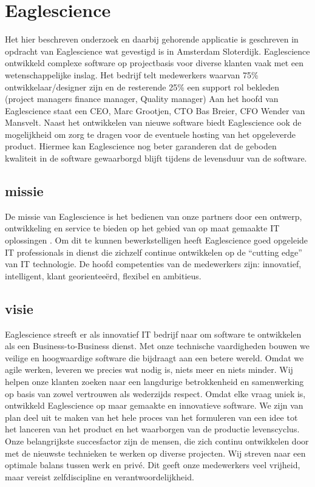 \chapter{Eaglescience} %

\label{ch:Eaglescience} %

Het hier beschreven onderzoek en daarbij gehorende applicatie is geschreven in opdracht van Eaglescience wat gevestigd is in Amsterdam Sloterdijk. Eaglescience ontwikkeld complexe software op projectbasis voor diverse klanten vaak met een wetenschappelijke inslag. Het bedrijf telt  medewerkers waarvan 75\% ontwikkelaar/designer zijn en de resterende 25\% een support rol bekleden (project managers finance manager, Quality manager)  Aan het hoofd van Eaglescience staat een CEO, Marc Grootjen, CTO Bas Breier, CFO Wender van Mansvelt. Naast het ontwikkelen van nieuwe software biedt Eaglescience ook de mogelijkheid om zorg te dragen voor de eventuele hosting van het opgeleverde product. Hiermee kan Eaglescience nog beter garanderen dat de geboden kwaliteit in de software gewaarborgd blijft tijdens de levensduur van de software.
\section{missie}
De missie van Eaglescience is het bedienen van onze partners door een ontwerp, ontwikkeling en service te bieden op het gebied van op maat gemaakte IT oplossingen . Om dit te kunnen bewerkstelligen heeft Eaglescience goed opgeleide IT professionals in dienst die zichzelf continue ontwikkelen op de “cutting edge” van IT technologie. De hoofd competenties van de medewerkers zijn: innovatief, intelligent, klant georientee\"erd, flexibel en ambitieus.
\section{visie}
Eaglescience streeft er als innovatief IT bedrijf naar om software te ontwikkelen als een Business-to-Business dienst. Met onze technische vaardigheden bouwen we veilige en hoogwaardige software die bijdraagt aan een betere wereld. Omdat we agile werken, leveren we precies wat nodig is, niets meer en niets minder. Wij helpen onze klanten zoeken naar een langdurige betrokkenheid en samenwerking op basis van zowel vertrouwen als wederzijds respect. Omdat elke vraag uniek is, ontwikkeld Eaglescience op maar gemaakte en innovatieve software. We zijn van plan deel uit te maken van het hele proces van het formuleren van een idee tot het lanceren van het product en het waarborgen van de productie levenscyclus. Onze belangrijkste succesfactor zijn de mensen, die zich continu ontwikkelen door met de nieuwste technieken te werken op diverse projecten. Wij streven naar een optimale balans tussen werk en priv\'e. Dit geeft onze medewerkers veel vrijheid, maar vereist zelfdiscipline en verantwoordelijkheid. 
